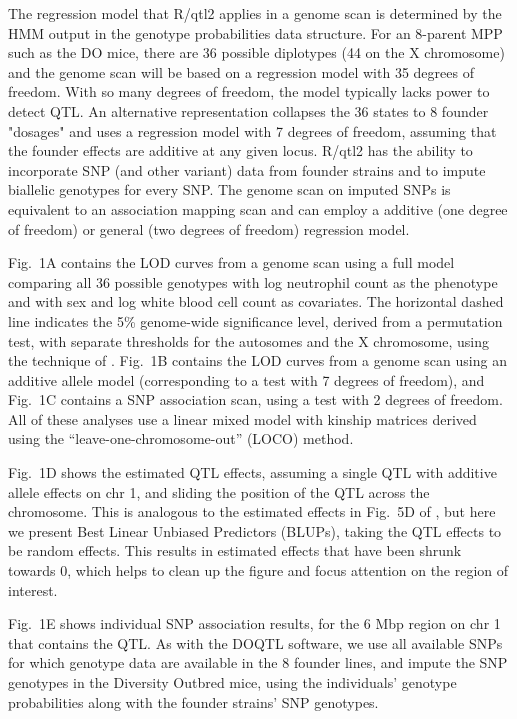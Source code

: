 \documentclass[12pt,letterpaper]{article}
\begin{document}
The regression model that R/qtl2 applies in a genome scan is determined by
the HMM output in the genotype probabilities data structure.
For an 8-parent MPP such as the DO mice, there are 36 possible diplotypes
(44 on the X chromosome) and the genome scan will be based on a
regression model with 35 degrees of freedom.
With so many degrees of freedom, the model typically lacks power to detect QTL.
An alternative representation collapses the 36 states to 8 founder "dosages"
and uses a regression model with 7 degrees of freedom, assuming that the founder effects are additive at any given locus.
R/qtl2 has the ability to incorporate SNP (and other variant) data from founder strains and
to impute biallelic genotypes for every SNP.  The genome scan on imputed SNPs is
equivalent to an association mapping scan and can employ a additive
(one degree of freedom) or general (two degrees of freedom)
regression model.

Fig.~1A contains the LOD curves from a genome scan using a full model
comparing all 36 possible genotypes
with log neutrophil count as the phenotype and with sex and log white blood
cell count as covariates. The horizontal dashed line indicates the 5\%
genome-wide significance level, derived from a permutation test,
with separate thresholds for the autosomes and the X chromosome, using
the technique of \citet{broman2006}. Fig.~1B contains the LOD curves
from a genome scan using an additive allele model (corresponding to a
test with 7 degrees of freedom), and Fig.~1C contains a SNP
association scan, using a test with 2 degrees of freedom. All of these
analyses use a linear mixed model with kinship matrices derived using
the ``leave-one-chromosome-out'' (LOCO) method.

Fig.~1D shows the estimated QTL effects, assuming a single QTL with
additive allele effects on chr 1, and sliding the position of the QTL
across the chromosome. This is analogous to the estimated effects in
Fig.~5D of \citet{gatti2014}, but here we present Best Linear Unbiased
Predictors (BLUPs), taking the QTL effects to be random effects. This
results in estimated effects that have been shrunk towards 0, which
helps to clean up the figure and focus attention on the region of
interest.

Fig.~1E shows individual SNP association results, for the 6 Mbp region
on chr 1 that contains the QTL. As with the DOQTL software, we use all
available SNPs for which genotype data are available in the 8 founder
lines, and impute the SNP genotypes in the Diversity Outbred mice, using the
individuals' genotype probabilities along with the founder strains'
SNP genotypes.
\end{document}
